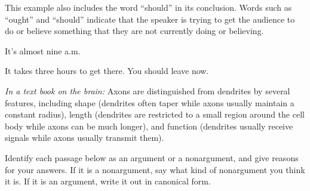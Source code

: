 \begin{exercises}
{This example also includes the word ``should'' in its conclusion. Words such as ``ought'' and ``should'' indicate that the speaker is trying to get the audience to do or believe something that they are not currently doing or believing.

\begin{earg*}
\item It's almost nine a.m. 
\item It takes three hours to get there.
\itemc  You should leave now.
\end{earg*}
}{\vspace{1.5in}}
      
\item \textit{In a text book on the brain:} Axons are distinguished from dendrites by several features, including shape (dendrites often taper while axons usually maintain a constant radius), length (dendrites are restricted to a small region around the cell body while axons can be much longer), and function (dendrites usually receive signals while axons usually transmit them).


\end{exercises}
%
\problempart Identify each passage below as an argument or a nonargument, and give reasons for your answers. If it is a nonargument, say what kind of nonargument you think it is. If it is an argument, write it out in canonical form.

